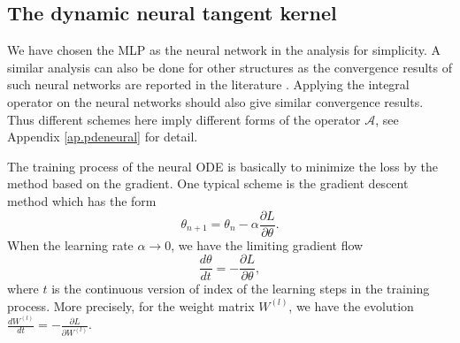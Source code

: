 \documentclass[hyperref]{article}
\newcommand{\pl}{\partial}
\numberwithin{equation}{section}
\theoremstyle{nonumberplain}
\begin{document}
	
	
	
	
	\subsection{The dynamic neural tangent kernel}
	
	We have chosen the MLP as the neural network in the analysis for simplicity. A similar analysis can also be done for other structures as the convergence results of such neural networks are reported in the literature \cite{allen2018learning, huang2020dynamics}. Applying the integral operator on the neural networks should also give similar convergence results. Thus different schemes here imply different forms of the operator $\mathcal{A}$, see Appendix \ref{ap.pdeneural} for detail. 
	
	
	The training process of the neural ODE is basically to minimize the loss by the method based on the gradient. One typical scheme is the gradient descent method which has the form 
	\begin{equation}
		\theta_{n+1} = \theta_n -\alpha\frac{\pl L}{\pl \theta}.
	\end{equation}
	When the learning rate $\alpha\to0$, we have the limiting gradient flow
	\begin{equation}
		\frac{d\theta}{d t} = -\frac{\pl L}{\pl \theta},
	\end{equation}
	where $t$ is the continuous version of index of the learning steps in the training process. More precisely, for the weight matrix $W^{(l)}$, we have the evolution 
	$\frac{dW^{(l)}}{d t} = -\frac{\pl L}{\pl W^{(l)}}.$
	
\end{document}
